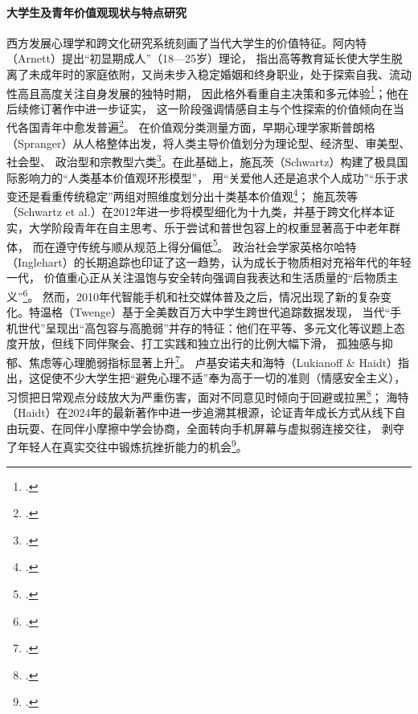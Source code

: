 \paragraph{大学生及青年价值观现状与特点研究}
西方发展心理学和跨文化研究系统刻画了当代大学生的价值特征。阿内特（Arnett）提出“初显期成人”（18—25岁）理论，
指出高等教育延长使大学生脱离了未成年时的家庭依附，又尚未步入稳定婚姻和终身职业，处于探索自我、流动性高且高度关注自身发展的独特时期，
因此格外看重自主决策和多元体验\footcite{Arnett2000}；他在后续修订著作中进一步证实，
这一阶段强调情感自主与个性探索的价值倾向在当代各国青年中愈发普遍\footcite{Arnett2023}。
在价值观分类测量方面，早期心理学家斯普朗格（Spranger）从人格整体出发，将人类主导价值划分为理论型、经济型、审美型、社会型、
政治型和宗教型六类\footcite{Spranger2017}。在此基础上，施瓦茨（Schwartz）构建了极具国际影响力的“人类基本价值观环形模型”，
用“关爱他人还是追求个人成功”“乐于求变还是看重传统稳定”两组对照维度划分出十类基本价值观\footcite{Schwartz1992}；
施瓦茨等（Schwartz et al.）在2012年进一步将模型细化为十九类，并基于跨文化样本证实，大学阶段青年在自主思考、乐于尝试和普世包容上的权重显著高于中老年群体，
而在遵守传统与顺从规范上得分偏低\footcite{Schwartz2012}。
政治社会学家英格尔哈特（Inglehart）的长期追踪也印证了这一趋势，认为成长于物质相对充裕年代的年轻一代，
价值重心正从关注温饱与安全转向强调自我表达和生活质量的“后物质主义”\footcite{Inglehart2018}。
然而，2010年代智能手机和社交媒体普及之后，情况出现了新的复杂变化。特温格（Twenge）基于全美数百万大中学生跨世代追踪数据发现，
当代“手机世代”呈现出“高包容与高脆弱”并存的特征：他们在平等、多元文化等议题上态度开放，但线下同伴聚会、打工实践和独立出行的比例大幅下滑，
孤独感与抑郁、焦虑等心理脆弱指标显著上升\footcite{Twenge2017}。
卢基安诺夫和海特（Lukianoff \& Haidt）指出，这促使不少大学生把“避免心理不适”奉为高于一切的准则（情感安全主义），
习惯把日常观点分歧放大为严重伤害，面对不同意见时倾向于回避或拉黑\footcite{Lukianoff2018}；
海特（Haidt）在2024年的最新著作中进一步追溯其根源，论证青年成长方式从线下自由玩耍、在同伴小摩擦中学会协商，全面转向手机屏幕与虚拟弱连接交往，
剥夺了年轻人在真实交往中锻炼抗挫折能力的机会\footcite{Haidt2024}。

